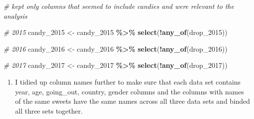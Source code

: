 \documentclass[
]{article}
\newenvironment{Shaded}{\begin{snugshade}}{\end{snugshade}}
\newcommand{\CommentTok}[1]{\textcolor[rgb]{0.56,0.35,0.01}{\textit{#1}}}
\newcommand{\FunctionTok}[1]{\textcolor[rgb]{0.13,0.29,0.53}{\textbf{#1}}}
\newcommand{\NormalTok}[1]{#1}
\newcommand{\OtherTok}[1]{\textcolor[rgb]{0.56,0.35,0.01}{#1}}
\newcommand{\SpecialCharTok}[1]{\textcolor[rgb]{0.81,0.36,0.00}{\textbf{#1}}}
\providecommand{\tightlist}{%
  \setlength{\itemsep}{0pt}\setlength{\parskip}{0pt}}
\begin{document}
\begin{Shaded}
\begin{Highlighting}[]
\CommentTok{\# kept only columns that seemed to include candies and were relevant to the analysis}

\CommentTok{\# 2015 }
\NormalTok{candy\_2015 }\OtherTok{\textless{}{-}}\NormalTok{ candy\_2015 }\SpecialCharTok{\%\textgreater{}\%} 
  \FunctionTok{select}\NormalTok{(}\SpecialCharTok{!}\FunctionTok{any\_of}\NormalTok{(drop\_2015))}

\CommentTok{\# 2016}
\NormalTok{candy\_2016 }\OtherTok{\textless{}{-}}\NormalTok{ candy\_2016 }\SpecialCharTok{\%\textgreater{}\%} 
  \FunctionTok{select}\NormalTok{(}\SpecialCharTok{!}\FunctionTok{any\_of}\NormalTok{(drop\_2016))}

\CommentTok{\# 2017}
\NormalTok{candy\_2017 }\OtherTok{\textless{}{-}}\NormalTok{ candy\_2017 }\SpecialCharTok{\%\textgreater{}\%} 
  \FunctionTok{select}\NormalTok{(}\SpecialCharTok{!}\FunctionTok{any\_of}\NormalTok{(drop\_2017))}
\end{Highlighting}
\end{Shaded}

\begin{enumerate}
\def\labelenumi{\arabic{enumi}.}
\setcounter{enumi}{4}
\tightlist
\item
  I tidied up column names further to make sure that each data set
  contains year, age, going\_out, country, gender columns and the
  columns with names of the same sweets have the same names across all
  three data sets and binded all three sets together.
\end{enumerate}
\end{document}
